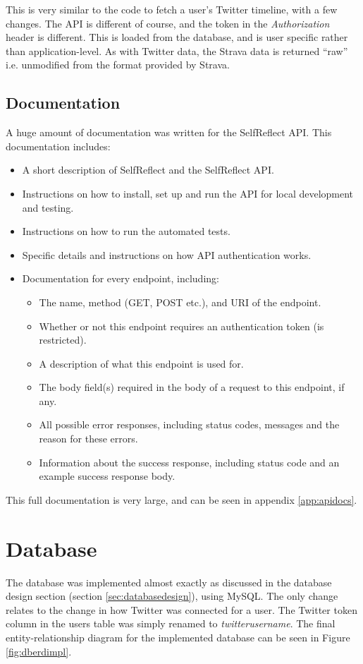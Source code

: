 \documentclass[11pt,openright,a4paper]{report}
\begin{document}
This is very similar to the code to fetch a user's Twitter timeline, with a few changes. The API is different of course, and the token in the \emph{Authorization} header is different. This is loaded from the database, and is user specific rather than application-level. As with Twitter data, the Strava data is returned \enquote{raw} i.e. unmodified from the format provided by Strava.

\subsection{Documentation} \label{sec:apidocs}
A huge amount of documentation was written for the SelfReflect API. This documentation includes:
\begin{itemize}
\item A short description of SelfReflect and the SelfReflect API.
\item Instructions on how to install, set up and run the API for local development and testing.
\item Instructions on how to run the automated tests.
\item Specific details and instructions on how API authentication works.
\item Documentation for every endpoint, including:
  \begin{itemize}
  \item The name, method (GET, POST etc.), and URI of the endpoint.
  \item Whether or not this endpoint requires an authentication token (is restricted).
  \item A description of what this endpoint is used for.
  \item The body field(s) required in the body of a request to this endpoint, if any.
  \item All possible error responses, including status codes, messages and the reason for these errors.
  \item Information about the success response, including status code and an example success response body.
  \end{itemize}
\end{itemize}

This full documentation is very large, and can be seen in appendix \ref{app:apidocs}.

\section{Database}
The database was implemented almost exactly as discussed in the database design section (section \ref{sec:databasedesign}), using MySQL. The only change relates to the change in how Twitter was connected for a user. The Twitter token column in the users table was simply renamed to \emph{twitter\textunderscore username}. The final entity-relationship diagram for the implemented database can be seen in Figure \ref{fig:dberdimpl}.
\end{document}
